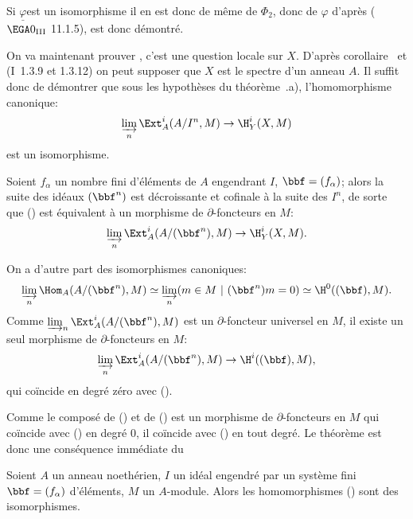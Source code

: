 Si $\underline{\varphi}$\pageoriginale est un isomorphisme il en est donc de m\^eme de $\Phi_2$, donc de $\varphi$ d'apr\`es ($\EGA 0_{\textup{III}}$ 11.1.5),  est donc d\'emontr\'e.

On va maintenant prouver , c'est une question locale sur $X$. D'apr\`es  corollaire~ et (\EGA I~1.3.9 et 1.3.12) on peut supposer que $X$ est le spectre d'un anneau $A$. Il suffit donc de d\'emontrer que sous les hypoth\`eses du th\'eor\`eme~.a), l'homomorphisme canonique:
\begin{equation} \label{eq:II.7.3} \varinjlim_{n} \Ext_A^i(A/I^n, M) \to \H_Y^i(X, M)
\end{equation}
est un isomorphisme.

Soient $f_{\alpha}$ un nombre fini d'\'el\'ements de $A$ engendrant $I$, $\bbf=(f_{\alpha})$; alors la suite des id\'eaux $(\bbf^n)$ est d\'ecroissante et cofinale \`a la suite des $I^n$, de sorte que () est \'equivalent \`a un morphisme de $\partial$-foncteurs en $M$:
\begin{equation} \label{eq:II.7.4} \varinjlim_{n} \Ext_A^i(A/(\bbf^n), M) \to \H_Y^i(X, M).
\end{equation}

On a d'autre part des isomorphismes canoniques:
\begin{equation} \label{eq:II.7.5} \varinjlim_{n} \Hom_A(A/(\bbf^n), M) \simeq \varinjlim_{n} (m\in M\ |\ (\bbf^n)m=0) \simeq \H^0((\bbf), M).
\end{equation}
Comme $\varinjlim_{n} \Ext_A^i(A/(\bbf^n), M)$ est un $\partial$-foncteur universel en $M$, il existe un seul morphisme de $\partial$-foncteurs en $M$:
\begin{equation} \label{eq:II.7.6} \varinjlim_{n} \Ext_A^i(A/(\bbf^n), M) \to \H^i((\bbf), M),
\end{equation}
qui co\"incide en degr\'e z\'ero avec ().

Comme le compos\'e de () et de () est un morphisme de $\partial$-foncteurs en $M$ qui co\"incide avec () en degr\'e $0$, il co\"incide avec () en tout degr\'e. Le th\'eor\`eme  est donc une cons\'equence imm\'ediate du

\begin{suplemme} \label{II.8}
Soient $A$ un anneau noeth\'erien, $I$ un id\'eal engendr\'e par un syst\`eme fini $\bbf=(f_{\alpha})$ d'\'el\'ements, $M$ un $A$-module. Alors les homomorphismes () sont des isomorphismes.
\end{suplemme}

